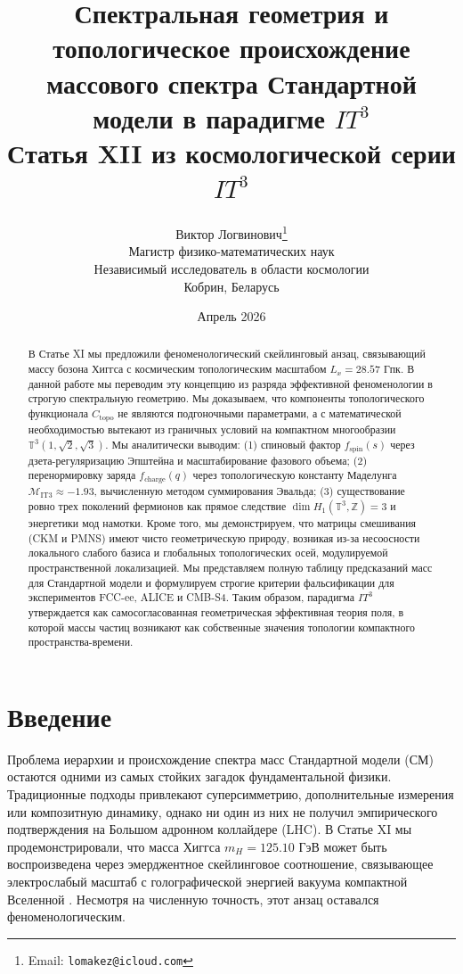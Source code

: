 \documentclass[12pt,a4paper]{article}
\title{\textbf{Спектральная геометрия и топологическое происхождение массового спектра Стандартной модели в парадигме $IT^3$}\\
\large Статья XII из космологической серии $IT^3$}
\author{Виктор Логвинович\thanks{Email: \texttt{lomakez@icloud.com}}\\
Магистр физико-математических наук\\
Независимый исследователь в области космологии\\
Кобрин, Беларусь}
\date{Апрель 2026}
\begin{document}
\maketitle

\begin{abstract}
В Статье XI мы предложили феноменологический скейлинговый анзац, связывающий массу бозона Хиггса с космическим топологическим масштабом $L_x = 28.57$ Гпк. В данной работе мы переводим эту концепцию из разряда эффективной феноменологии в строгую спектральную геометрию. Мы доказываем, что компоненты топологического функционала $C_{\text{topo}}$ не являются подгоночными параметрами, а с математической необходимостью вытекают из граничных условий на компактном многообразии $\mathbb{T}^3(1,\sqrt{2},\sqrt{3})$. Мы аналитически выводим: (1) спиновый фактор $f_{\text{spin}}(s)$ через дзета-регуляризацию Эпштейна и масштабирование фазового объема; (2) перенормировку заряда $f_{\text{charge}}(q)$ через топологическую константу Маделунга $\mathcal{M}_{\text{IT3}} \approx -1.93$, вычисленную методом суммирования Эвальда; (3) существование ровно трех поколений фермионов как прямое следствие $\dim H_1(\mathbb{T}^3,\mathbb{Z}) = 3$ и энергетики мод намотки. Кроме того, мы демонстрируем, что матрицы смешивания (CKM и PMNS) имеют чисто геометрическую природу, возникая из-за несоосности локального слабого базиса и глобальных топологических осей, модулируемой пространственной локализацией. Мы представляем полную таблицу предсказаний масс для Стандартной модели и формулируем строгие критерии фальсификации для экспериментов FCC-ee, ALICE и CMB-S4. Таким образом, парадигма $IT^3$ утверждается как самосогласованная геометрическая эффективная теория поля, в которой массы частиц возникают как собственные значения топологии компактного пространства-времени.
\end{abstract}

\section{Введение}
Проблема иерархии и происхождение спектра масс Стандартной модели (СМ) остаются одними из самых стойких загадок фундаментальной физики. Традиционные подходы привлекают суперсимметрию, дополнительные измерения или композитную динамику, однако ни один из них не получил эмпирического подтверждения на Большом адронном коллайдере (LHC). В Статье XI мы продемонстрировали, что масса Хиггса $m_H = 125.10$ ГэВ может быть воспроизведена через эмерджентное скейлинговое соотношение, связывающее электрослабый масштаб с голографической энергией вакуума компактной Вселенной \cite{PaperXI}. Несмотря на численную точность, этот анзац оставался феноменологическим.
\end{document}
